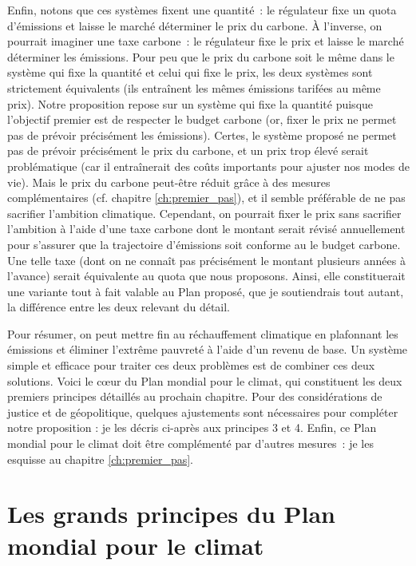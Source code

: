 \documentclass[a5paper,french]{memoir}
\begin{document}
Enfin, notons que ces systèmes fixent une quantité~: le régulateur fixe un quota d'émissions et laisse le marché déterminer le prix du carbone. À l'inverse, on pourrait imaginer une taxe carbone~: le régulateur fixe le prix et laisse le marché déterminer les émissions. Pour peu que le prix du carbone soit le même dans le système qui fixe la quantité et celui qui fixe le prix, les deux systèmes sont strictement équivalents (ils entraînent les mêmes émissions tarifées au même prix). Notre proposition repose sur un système qui fixe la quantité puisque l'objectif premier est de respecter le budget carbone (or, fixer le prix ne permet pas de prévoir précisément les émissions). Certes, le système proposé ne permet pas de prévoir précisément le prix du carbone, et un prix trop élevé serait problématique (car il entraînerait des coûts importants pour ajuster nos modes de vie). Mais le prix du carbone peut-être réduit grâce à des mesures complémentaires (cf. chapitre \ref{ch:premier_pas}), et il semble préférable de ne pas sacrifier l'ambition climatique. Cependant, on pourrait fixer le prix sans sacrifier l'ambition à l'aide d'une taxe carbone dont le montant serait révisé annuellement pour s'assurer que la trajectoire d'émissions soit conforme au le budget carbone. Une telle taxe (dont on ne connaît pas précisément le montant plusieurs années à l'avance) serait équivalente au quota que nous proposons. Ainsi, elle constituerait une variante tout à fait valable au Plan proposé, que je soutiendrais tout autant, la différence entre les deux relevant du détail. 

Pour résumer, on peut mettre fin au réchauffement climatique en plafonnant les émissions et éliminer l'extrême pauvreté à l'aide d'un revenu de base. Un système simple et efficace pour traiter ces deux problèmes est de combiner ces deux solutions. Voici le cœur du Plan mondial pour le climat, %
qui constituent les deux premiers principes détaillés au prochain chapitre. Pour des considérations de justice et de géopolitique, quelques ajustements sont nécessaires pour compléter notre proposition : je les décris ci-après aux principes 3 et 4. Enfin, ce Plan mondial pour le climat doit être complémenté par d'autres mesures~: je les esquisse au chapitre \ref{ch:premier_pas}.


\chapter{Les grands principes du Plan mondial pour le climat\label{ch:principes}}
\end{document}
